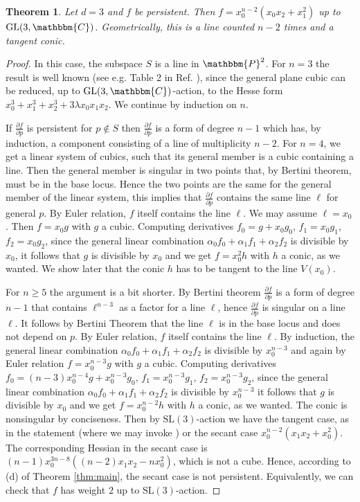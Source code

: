 \documentclass[aps,floatfix,groupedaddress,superscriptaddress,longbibliography,footinbib,notitlepage,showpacs]{revtex4-1}
\newtheorem{theorem}{Theorem}
\begin{document}
\begin{theorem}
Let $d=3$ and $f$ be persistent. Then $f=x_0^{n-2}(x_0x_2+x_1^2)$ up to $\mathrm{GL}(3,\mathbbm{C})$.
Geometrically, this is a line counted $n-2$ times and a tangent conic.
\end{theorem}
\begin{proof}
In this case, the subspace $S$ is a line in $\mathbbm{P}^2$. For $n=3$ the result is well known (see e.g. Table 2 in Ref. \cite{Ban}), since the general plane cubic can be reduced, up to $\mathrm{GL}(3,\mathbbm{C})$-action, to the Hesse form $x_0^3+x_1^3+x_2^3+3\lambda x_0x_1x_2$. We continue by induction on $n$. 

If $\frac{\partial f}{\partial p}$ is persistent for $p\notin S$ then $\frac{\partial f}{\partial p}$ is a form of degree $n-1$ which has, by induction, a component consisting of a line of multiplicity $n-2$. 
For $n=4$, we get a linear system of cubics, such that its general member is a cubic containing a line. Then the general member is singular in two points that, by Bertini theorem, must be in the base locus. Hence the two points are the same for the general member of the linear system, this implies that $\frac{\partial f}{\partial p}$ contains the same line $\ell$ for general $p$. By Euler relation, $f$ itself contains the line $\ell$. We may assume $\ell=x_0$. Then $f=x_0g$ with $g$ a cubic. Computing derivatives $f_0=g+x_0g_0$, $f_1=x_0g_1$, $f_2=x_0g_2$, since the general linear combination $\alpha_0f_0+\alpha_1f_1+\alpha_2f_2$ is divisible by $x_0$, it follows that $g$ is divisible by $x_0$ and we get $f=x_0^2h$ with $h$ a conic, as we wanted. We show later that the conic $h$ has to be tangent to the line $V(x_0)$. 

For $n\geq 5$ the argument is a bit shorter. By Bertini theorem $\frac{\partial f}{\partial p}$ is a form of degree $n-1$ that contains $\ell^{n-3}$ as a factor for a line $\ell$, hence 
 $\frac{\partial f}{\partial p}$ is singular on a line $\ell$. It follows by Bertini Theorem that the line $\ell$ is in the base locus and does not depend on $p$. By Euler relation, $f$ itself contains the line $\ell$. By induction,  the general linear combination $\alpha_0f_0+\alpha_1f_1+\alpha_2f_2$ is divisible by $x_0^{n-3}$ and again by Euler relation $f=x_0^{n-3}g$ with $g$ a cubic. Computing derivatives $f_0=(n-3)x_0^{n-4}g+x_0^{n-3}g_0$, $f_1=x_0^{n-3}g_1$, $f_2=x_0^{n-3}g_2$, since the general linear combination $\alpha_0f_0+\alpha_1f_1+\alpha_2f_2$ is divisible by $x_0^{n-3}$ it follows that $g$ is divisible by $x_0$ and we get $f=x_0^{n-2}h$ with $h$ a conic, as we wanted. The conic is nonsingular by conciseness. Then by $\mathrm{SL}(3)$-action we have the tangent case, as in the statement (where we may invoke \cite[Prop. 2.7]{COCDR}) or the secant case
$x_0^{n-2}(x_1x_2+x_0^2)$. The corresponding Hessian in the secant case is
$(n-1)x_0^{3n-8}\left((n-2)x_1x_2-nx_0^2\right)$, which is not a cube. Hence, according to (d) of Theorem \ref{thm:main}, the secant case is not persistent. Equivalently, we can check that
$f$ has weight $2$ up to $\mathrm{SL}(3)$-action.
\end{proof}
\end{document}
